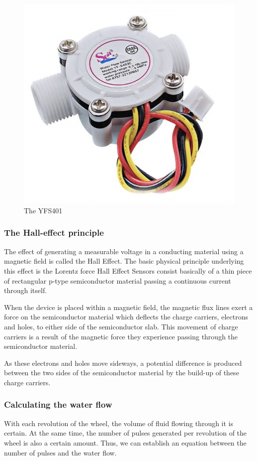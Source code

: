 \documentclass[12pt]{article}
\begin{document}
\begin{figure}[h!]
    \centering
    \includegraphics[scale=0.4]{sensor.png}
    \caption{The YFS401}
    \label{fig:notmy_label}
\end{figure}
\subsubsection*{The Hall-effect principle}
The effect of generating a measurable voltage in a conducting material using a magnetic field is called the Hall Effect. The basic physical principle underlying this effect is the Lorentz force
Hall Effect Sensors consist basically of a thin piece of rectangular p-type semiconductor material passing a continuous current through itself.

When the device is placed within a magnetic field, the magnetic flux lines exert a force on the semiconductor material which deflects the charge carriers, electrons and holes, to either side of the semiconductor slab. This movement of charge carriers is a result of the magnetic force they experience passing through the semiconductor material.

As these electrons and holes move sideways, a potential difference is produced between the two sides of the semiconductor material by the build-up of these charge carriers.


\subsubsection*{Calculating the water flow}
With each revolution of the wheel, the volume of fluid flowing through it is certain. At the same time, the number of pulses generated per revolution of the wheel is also a certain amount. Thus, we can establish an equation between the number of pulses and the water flow.
\end{document}
